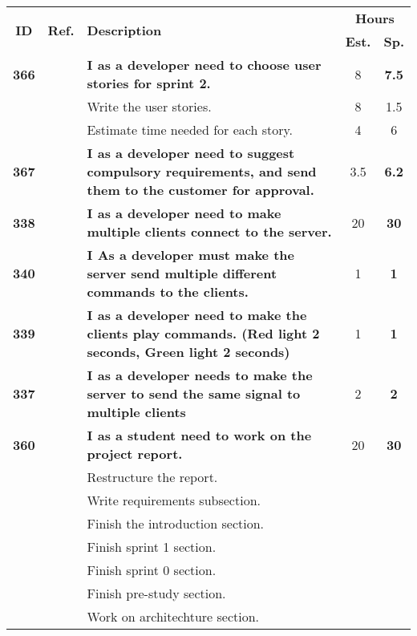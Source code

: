   \label{tab:sprint2stories}
 \def\arraystretch{1.25}
 
\begin{longtable}{ccXcc}
\toprule[1mm]
\multirow{2}{*}{\textbf{ID}} &
\multirow{2}{*}{\textbf{Ref.}} & \multirow{2}{*}{\textbf{Description}} & \multicolumn{2}{c}{\textbf{Hours}} \\
 				& & & \textbf{Est.} & \textbf{Sp.} \\ 				
\midrule
\textbf{366} 	& {M6}
	& {\bf I as a developer need to choose user stories for sprint 2.} 	& 	8	& \textbf{7.5} \\
				&& Write the user stories. 	& 8 &  1.5 \\
				&& Estimate time needed for each story. 	&  4 & 6 \\	

	
\textbf{367} 	& {M6}
	& {\bf I as a developer need to suggest compulsory requirements, and send them to the customer for approval.} 	& 		3.5	& \textbf{6.2} \\

\textbf{338} 	& {M6}
	& {\bf I as a developer need to make multiple clients connect to the server.} 	& 	20		& \textbf{30} \\


\textbf{340} 	& {M6}
	& {\bf I As a developer must make the server send multiple different commands to the clients. } 	& 		1	& \textbf{1} \\

\textbf{339} 	& {M3}
	& {\bf  I as a developer need to make the clients play commands. (Red light 2 seconds, Green light 2 seconds)} 	& 		1	& \textbf{1} \\

\textbf{337} 	& {M3}
	& {\bf  I as a developer needs to make the server to send the same signal to multiple clients} 	& 		2	& \textbf{2} \\
		
\midrule
\textbf{360} 	& {M6}
	& {\bf I as a student need to work on the project report.} 	& 	20	& \textbf{ 30} \\
				&& Restructure the report.	&  &  \\
				&& Write requirements subsection.	&  &  \\
				&& Finish the introduction section.	&  & \\
				&& Finish sprint 1 section.	&  &  \\
				&& Finish sprint 0 section.	&  &  \\
				&& Finish pre-study section.	&  &  \\
				&& Work on architechture section.	&  &  \\


\end{longtable}

